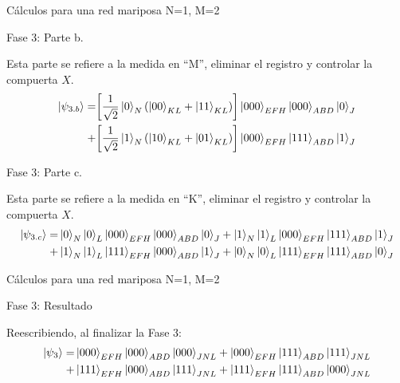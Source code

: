 \documentclass[10pt]{beamer}
\renewenvironment{alertblock}[1]
    {\begin{oldalertblock}{#1}
        \smallskip
    }
    {
    \end{oldalertblock}
    }
\begin{document}
\begin{frame}{Cálculos para una red mariposa N=1, M=2}
  \begin{alertblock}{Fase 3: Parte b.}
    Esta parte se refiere a la medida en ``M'', eliminar el registro y controlar la compuerta $X$.
    \begin{align*}
    \ket{\psi_{3.b}} = & \qty[ \frac{1}{\sqrt{2}} \ket{0}_{N}(\ket{00}_{KL}+\ket{11}_{KL})]\ket{000}_{EFH}\ket{000}_{ABD}\ket{0}_{J} \\
                      + & \qty[ \frac{1}{\sqrt{2}} \ket{1}_{N}(\ket{10}_{KL}+\ket{01}_{KL})]\ket{000}_{EFH}\ket{111}_{ABD}\ket{1}_{J}
    \end{align*}
  \end{alertblock}
  \begin{alertblock}{Fase 3: Parte c.}
    Esta parte se refiere a la medida en ``K'', eliminar el registro y controlar la compuerta $X$.
    \begin{align*}
    \ket{\psi_{3.c}}
    = & \ket{0}_{N} \ket{0}_{L} \ket{000}_{EFH} \ket{000}_{ABD} \ket{0}_{J}
      + \ket{1}_{N} \ket{1}_{L} \ket{000}_{EFH} \ket{111}_{ABD} \ket{1}_{J} \\
    + & \ket{1}_{N} \ket{1}_{L} \ket{111}_{EFH} \ket{000}_{ABD} \ket{1}_{J} 
      + \ket{0}_{N} \ket{0}_{L} \ket{111}_{EFH} \ket{111}_{ABD} \ket{0}_{J} 
    \end{align*}
  \end{alertblock}
\end{frame}

\begin{frame}{Cálculos para una red mariposa N=1, M=2}
  \begin{alertblock}{Fase 3: Resultado}
    Reescribiendo, al finalizar la Fase 3:
    \begin{align*}
    \ket{\psi_{3}}=&\ket{000}_{EFH} \ket{000}_{ABD} \ket{000}_{JNL} +\ket{000}_{EFH} \ket{111}_{ABD} \ket{111}_{JNL} \\
    +&\ket{111}_{EFH} \ket{000}_{ABD} \ket{111}_{JNL} + \ket{111}_{EFH} \ket{111}_{ABD} \ket{000}_{JNL} 
    \end{align*}
  \end{alertblock}
\end{frame}
\end{document}
